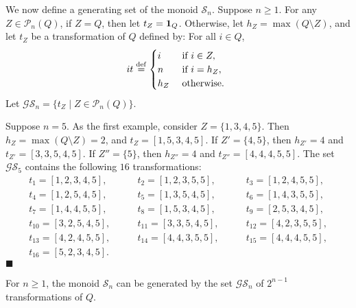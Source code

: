 \documentclass{llncs}
\renewcommand{\ge}{\geqslant}
\newcommand{\txt}[1]{\mbox{ #1 }}
\newcommand{\defeq}{\stackrel{\rm def}{=}}
\newcommand{\tid}{\mbox{{\bf 1}}}
\newcommand{\cG}{{\mathcal G}}
\newcommand{\cP}{{\mathcal P}}
\newcommand{\cS}{{\mathcal S}}
\newcommand{\qedb}{\hfill$\blacksquare$}
\begin{document}
We now define a generating set of the monoid $\cS_n$. 
Suppose $n \ge 1$. For any $Z \in \cP_n(Q)$, if $Z = Q$, then let $t_Z = \tid_Q$. Otherwise, let $h_Z = \max(Q \setminus Z)$, and let $t_Z$ be a transformation of $Q$ defined by: For all $i \in Q$, 
\begin{equation*}
it \defeq \begin{cases} i & \txt{if} i \in Z, \\
n & \txt{if} i = h_Z, \\
h_Z & \txt{otherwise.}
\end{cases}
\end{equation*}
Let $\cG\cS_n = \{t_Z \mid Z \in \cP_n(Q)\}$. 




\begin{example}\label{ex:genJT}
Suppose $n = 5$. As the first example, consider $Z = \{1,3,4,5\}$. Then $h_Z = \max(Q \setminus Z) = 2$, and $t_Z = [1,5,3,4,5]$. If $Z' = \{4,5\}$, then $h_{Z'} = 4$ and $t_{Z'} = [3,3,5,4,5]$. If $Z'' = \{5\}$, then $h_{Z''} = 4$ and $t_{Z''} = [4,4,4,5,5]$. The set $\cG\cS_5$ contains the following $16$ transformations: 
$$\begin{array}{lll}
t_1 = [ 1, 2, 3, 4, 5 ], \quad & \quad t_2 = [ 1, 2, 3, 5, 5 ], \quad & \quad t_3 = [ 1, 2, 4, 5, 5 ], \\
t_4 = [ 1, 2, 5, 4, 5 ], \quad & \quad t_5 = [ 1, 3, 5, 4, 5 ], \quad & \quad t_6 = [ 1, 4, 3, 5, 5 ], \\
t_7 = [ 1, 4, 4, 5, 5 ], \quad & \quad t_8 = [ 1, 5, 3, 4, 5 ], \quad & \quad t_9 = [ 2, 5, 3, 4, 5 ], \\
t_{10} = [ 3, 2, 5, 4, 5 ], \quad & \quad t_{11} = [ 3, 3, 5, 4, 5 ], \quad & \quad t_{12} = [ 4, 2, 3, 5, 5 ], \\
t_{13} = [ 4, 2, 4, 5, 5 ], \quad & \quad t_{14} = [ 4, 4, 3, 5, 5 ], \quad & \quad t_{15} = [ 4, 4, 4, 5, 5 ], \\
t_{16} = [ 5, 2, 3, 4, 5 ].
\end{array}$$ 
\qedb
\end{example}


\begin{proposition}\label{prop:genJT}
For $n \ge 1$, the monoid $\cS_n$ can be generated by the set $\cG\cS_n$ of $2^{n-1}$ transformations of $Q$. 
\end{proposition}
\end{document}
